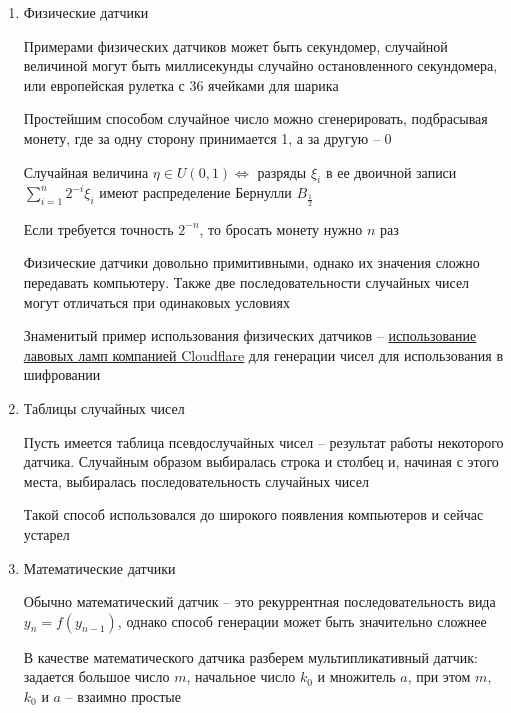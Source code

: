 \begin{enumerate}[label*=\Roman*. ]
    \item Физические датчики

    Примерами физических датчиков может быть секундомер, случайной величиной могут быть миллисекунды случайно остановленного секундомера, или европейская рулетка с 36 ячейками для шарика

    Простейшим способом случайное число можно сгенерировать, подбрасывая монету, где за одну сторону принимается 1, а за другую -- 0

    \begin{MyTheorem}
        \Ths Случайная величина $\eta \in U(0, 1) \Longleftrightarrow$ разряды $\xi_i$ в ее двоичной записи $\sum_{i = 1}^n 2^{-i} \xi_i$ имеют распределение Бернулли $B_{\frac{1}{2}}$
    \end{MyTheorem}

    Если требуется точность $2^{-n}$, то бросать монету нужно $n$ раз 

    Физические датчики довольно примитивными, однако их значения сложно передавать компьютеру. Также две последовательности случайных чисел могут отличаться при одинаковых условиях

    Знаменитый пример использования физических датчиков -- \href{https://www.cloudflare.com/learning/ssl/lava-lamp-encryption/}{использование лавовых ламп компанией Cloudflare} для генерации чисел для использования в шифровании

    \item Таблицы случайных чисел

    Пусть имеется таблица псевдослучайных чисел -- результат работы некоторого датчика. Случайным образом выбиралась строка и столбец и, начиная с этого места, выбиралась последовательность случайных чисел

    Такой способ использовался до широкого появления компьютеров и сейчас устарел

    \hypertarget{mathematical_rng}{}

    \item Математические датчики

    Обычно математический датчик -- это рекуррентная последовательность вида $y_n = f(y_{n - 1})$, однако способ генерации может быть значительно сложнее

    В качестве математического датчика разберем мультипликативный датчик: задается большое число $m$, начальное число $k_0$ и множитель $a$, при этом $m$, $k_0$ и $a$ -- взаимно простые


\end{enumerate}
